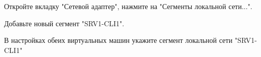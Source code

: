 \documentclass[a4paper, 12pt]{report}
\begin{document}
	\clearpage

	Откройте вкладку "Сетевой адаптер", нажмите на "Сегменты локальной сети...".

	\begin{figure}[h]
		\label{fig:image}
	\end{figure}

	\clearpage

	Добавьте новый сегмент "SRV1-CLI1".
	
	\begin{figure}[h]
		\label{fig:image}
	\end{figure}

	В настройках обеих виртуальных машин укажите сегмент локальной сети "SRV1-CLI1"
	
\end{document}
